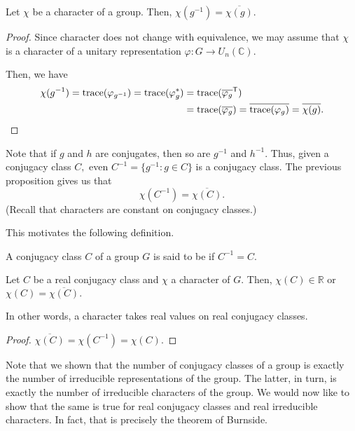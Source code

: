 \begin{prop}
	Let $\chi$ be a character of a group. Then, $\chi(g^{-1}) = \overline{\chi(g)}.$
\end{prop}
\begin{proof} 
	Since character does not change with equivalence, we may assume that $\chi$ is a character of a unitary representation $\varphi : G \to U_n(\mathbb{C}).$

	Then, we have
	\begin{align*} 
		\chi(g^{-1}) = \operatorname{trace}(\varphi_{g^{-1}}) = \operatorname{trace}(\varphi_g^*) &= \operatorname{trace}(\overline{\varphi_g}^\mathsf{T}) \\
		&= \operatorname{trace}(\overline{\varphi_g}) = \overline{\operatorname{trace}(\varphi_g)} = \overline{\chi(g)}. \qedhere
	\end{align*}
\end{proof}

\begin{rem} \label{rem:conjofconjisconj}
	Note that if $g$ and $h$ are conjugates, then so are $g^{-1}$ and $h^{-1}.$ Thus, given a conjugacy class $C,$ even $C^{-1} = \{g^{-1} : g \in C\}$ is a conjugacy class. The previous proposition gives us that
	\begin{equation*} 
		\chi(C^{-1}) = \overline{\chi(C)}.
	\end{equation*}
	(Recall that characters are constant on conjugacy classes.)

	This motivates the following definition.
\end{rem}

\begin{defn}%
	A conjugacy class $C$ of a group $G$ is said to be  if $C^{-1} = C.$
\end{defn}


\begin{prop}
	Let $C$ be a real conjugacy class and $\chi$ a character of $G.$ Then, $\chi(C) \in \mathbb{R}$ or $\chi(C) = \overline{\chi(C)}.$ 
\end{prop}
In other words, a character takes real values on real conjugacy classes.
\begin{proof} 
	$\overline{\chi(C)} = \chi(C^{-1}) = \chi(C).$
\end{proof}

Note that we shown that the number of conjugacy classes of a group is exactly the number of irreducible representations of the group. The latter, in turn, is exactly the number of irreducible characters of the group. We would now like to show that the same is true for real conjugacy classes and real irreducible characters. In fact, that is precisely the theorem of Burnside.

